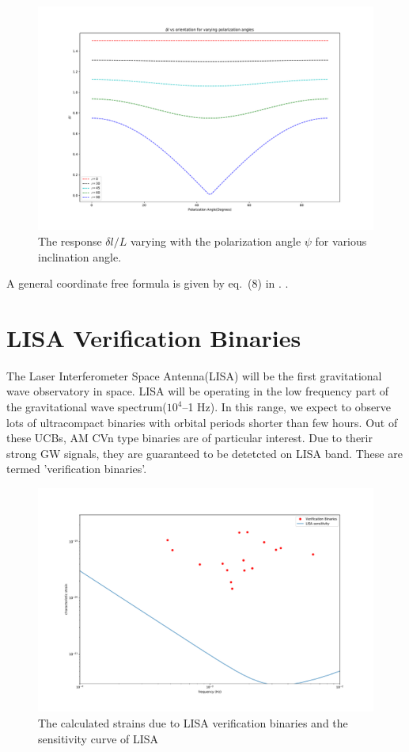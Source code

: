 \documentclass[10pt,a4paper]{article}
\begin{document}
\begin{figure}[!h]
\centering
\includegraphics[scale=0.3]{../Figures/responsevsorientationofbinary.pdf}
\caption{The response $\delta l/L$ varying with the polarization
  angle $\psi$ for various inclination angle.\label{fig:resporient}}
\end{figure}


A general coordinate free formula is given by eq.~(8) in \cite{cornish}.
\citep{ACST}.
\citep{cutler}
 

\newpage
\section*{LISA Verification Binaries}
The Laser Interferometer Space Antenna(LISA) will be the first gravitational wave observatory in space. LISA will be operating in the low frequency part of the gravitational wave spectrum($10^4$--1 Hz). In this range, we expect to observe lots of ultracompact binaries with orbital periods shorter than few hours. Out of these UCBs, AM CVn type binaries are of particular interest. Due to therir strong GW signals, they are guaranteed to be  detetcted on LISA band. These are termed 'verification binaries'.


\begin{figure}[ht]
\centering
\includegraphics[scale=0.25]{../Figures/strain_verific_binary.pdf}
\caption{The calculated strains due to LISA verification binaries and the sensitivity curve of LISA}
\end{figure}
\end{document}
